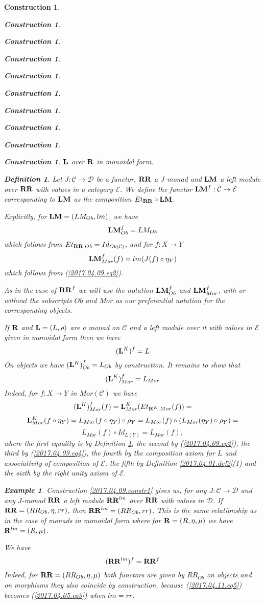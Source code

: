 \documentclass[12pt]{amsart}
\newenvironment{eq}{\begin{equation}}{\end{equation}}
\newtheorem{definition}[proposition]{Definition}
\newtheorem{example}[proposition]{Example}
\newtheorem{construction}[proposition]{Construction}
\newcommand{\llabel}[1]{\label{#1}}
\newcommand{\sr}{\rightarrow}
\newcommand{\R}{{\bf R}}
\newcommand{\RR}{{\bf RR}}
\newcommand{\LM}{{\bf LM}}
\newcommand{\C}{{\mathcal C}}
\newcommand{\D}{{\mathcal D}}
\newcommand{\E}{{\mathcal E}}
\begin{document}
\begin{construction}
\begin{construction}
\begin{construction}
\begin{construction}
\begin{construction}
\begin{construction}
\begin{construction}
\begin{construction}
\begin{construction}
\begin{construction}
${\bf L}$ over $\R$ in monoidal form.
%
\begin{definition}
\llabel{2017.04.05.def1} 
Let $J:\C\sr\D$ be a functor, $\RR$ a $J$-monad and
$\LM$ a left module over $\RR$ with values in a category $\E$. We define the
functor $\LM^f:\C\sr \E$ corresponding to $\LM$ as the composition
$Et_{\RR}\circ \LM$.
\end{definition}
%
Explicitly, for $\LM=(LM_{Ob},lm)$, we have
%
$$\LM^f_{Ob}=LM_{Ob}$$
%
which follows from $Et_{\RR,Ob}=Id_{Ob(\C)}$, and for $f:X\sr Y$ 
%
\begin{eq}\llabel{2017.04.11.eq5}
\LM^f_{Mor}(f)=lm(J(f)\circ \eta_{Y})
\end{eq}%
%
which follows from (\ref{2017.04.09.eq2}). 

As in the case of $\RR^f$ we will use the notation $\LM^f_{Ob}$ and
$\LM^f_{Mor}$, with or without the subscripts $Ob$ and $Mor$ as our
preferential notation for the corresponding objects.

If $\R$ and ${\bf L}=(L,\rho)$ are a monad on $\C$ and a left module over it
with values in $\E$ given in monoidal form then we have
%
\begin{eq}
\llabel{2017.04.17.eq4}
({\bf L}^K)^f=L
\end{eq}%
%
On objects we have $({\bf L}^K)^f_{Ob}=L_{Ob}$ by construction. It remains to
show that
%
\begin{eq}\llabel{2017.04.09.eq1}
({\bf L}^K)^f_{Mor}=L_{Mor}
\end{eq}%
%
Indeed, for $f:X\sr Y$ in $Mor(\C)$ we have
%
$$({\bf L}^K)^f_{Mor}(f)={\bf L}^K_{Mor}(Et_{\R^K,Mor}(f))=
$$$${\bf L}^K_{Mor}(f\circ \eta_Y)=L_{Mor}(f\circ \eta_Y)\circ \rho_Y=L_{Mor}(f)\circ (L_{Mor}(\eta_Y)\circ \rho_Y)=
$$$$L_{Mor}(f)\circ Id_{L(Y)}=L_{Mor}(f),$$
%
where the first equality is by Definition \ref{2017.04.05.def1}, the second by
(\ref{2017.04.09.eq2}), the third by (\ref{2017.04.09.eq4}), the fourth by the
composition axiom for $L$ and associativity of composition of $\E$, the fifth
by Definition \ref{2017.04.01.def2}(1) and the sixth by the right unity axiom
of $\E$.
%
\begin{example}\rm
\llabel{2017.04.15.ex2}
Construction \ref{2017.04.09.constr1} gives us, for any $J:\C\sr \D$ and any
$J$-monad $\RR$ a left module $\RR^{lm}$ over $\RR$ with values in $\D$.  If
$\RR=(RR_{Ob},\eta,rr)$, then $\RR^{lm}=(RR_{Ob},rr)$. This is the same
relationship as in the case of monads in monoidal form where for
$\R=(R,\eta,\mu)$ we have $\R^{lm}=(R,\mu)$.

We have 
%
$$(\RR^{lm})^f=\RR^f$$
%
Indeed, for $\RR=(RR_{Ob},\eta,\mu)$ both functors are given by $RR_{Ob}$ on
objects and on morphisms they also coincide by construction, because
(\ref{2017.04.11.eq5}) becomes (\ref{2017.04.05.eq3}) when $lm=rr$.


\end{example}
\end{construction}
\end{construction}
\end{construction}
\end{construction}
\end{construction}
\end{construction}
\end{construction}
\end{construction}
\end{construction}
\end{construction}
\end{document}
